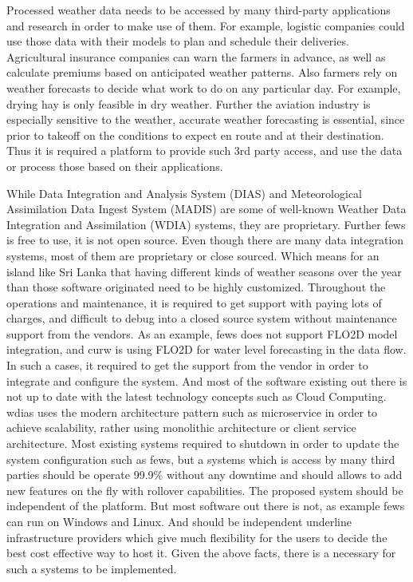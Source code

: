Processed weather data needs to be accessed by many third-party applications and research in order to make use of them. For example, logistic companies could use those data with their models to plan and schedule their deliveries. Agricultural insurance companies can warn the farmers in advance, as well as calculate premiums based on anticipated weather patterns. Also farmers rely on weather forecasts to decide what work to do on any particular day. For example, drying hay is only feasible in dry weather. Further the aviation industry is especially sensitive to the weather, accurate weather forecasting is essential, since prior to takeoff on the conditions to expect en route and at their destination. 
Thus it is required a platform to provide such 3rd party access, and use the data or process those based on their applications.

While Data Integration and Analysis System (DIAS) \cite{Kawasaki2018DataReduction} and Meteorological Assimilation Data Ingest System (MADIS) \cite{Macdermaid2005ARCHITECTUREP2.39} are some of well-known Weather Data Integration and Assimilation (WDIA) systems, they are proprietary. Further \acrfull{fews} \cite{Werner2013TheSystem} is free to use, it is not open source.
Even though there are many data integration systems, most of them are proprietary or close sourced. Which means for an island like Sri Lanka that having different kinds of weather seasons over the year than those software originated need to be highly customized. Throughout the operations and maintenance, it is required to get support with paying lots of charges, and difficult to debug into a closed source system without maintenance support from the vendors. As an example, \acrshort{fews} does not support FLO2D model integration, and \acrshort{curw} is using FLO2D for water level forecasting in the data flow. In such a cases, it required to get the support from the vendor in order to integrate and configure the system.
And most of the software existing out there is not up to date with the latest technology concepts such as Cloud Computing. \acrfull{wdias} uses the modern architecture pattern such as microservice in order to achieve scalability, rather using monolithic architecture or client service architecture. Most existing systems required to shutdown in order to update the system configuration such as \acrshort{fews}, but a systems which is access by many third parties should be operate 99.9\% without any downtime and should allows to add new features on the fly with rollover capabilities. The proposed system should be independent of the platform. But most software out there is not, as example \acrshort{fews} can run on Windows and Linux. And should be independent underline infrastructure providers which give much flexibility for the users to decide the best cost effective way to host it. Given the above facts, there is a necessary for such a systems to be implemented.

